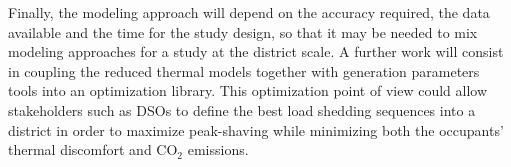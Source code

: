 \documentclass[buildings,article,submit,moreauthors,pdftex,10pt,a4paper]{mdpi}
\theoremstyle{mdpi}
\newcounter{re}
\theoremstyle{mdpidefinition}
\begin{document}
Finally, the modeling approach will depend on the accuracy required, the data available and the time for the study design, so that it may be needed to mix modeling approaches for a study at the district scale.
A further work will consist in coupling the reduced thermal models together with generation parameters tools into an optimization library. This optimization point of view could allow stakeholders such as DSOs to define the best load shedding sequences into a district in order to maximize peak-shaving while minimizing both the occupants' thermal discomfort and CO$_2$ emissions.

 
\end{document}
